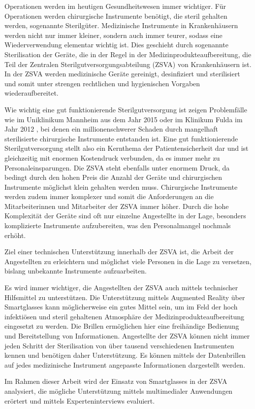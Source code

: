 
Operationen werden im heutigen Gesundheitswesen immer wichtiger. Für Operationen werden chirurgische Instrumente benötigt, die steril gehalten werden, sogenannte Sterilgüter.
Medizinische Instrumente in Krankenhäusern werden nicht nur immer kleiner, sondern auch immer teurer, sodass eine Wiederverwendung elementar wichtig ist. Dies geschieht durch sogenannte Sterilisation der Geräte, die in der Regel in der Medizinprodukteaufbereitung, die Teil der Zentralen Sterilgutversorgungsabteilung (ZSVA) von Krankenhäusern ist. In der ZSVA werden medizinische Geräte gereinigt, desinfiziert und sterilisiert und somit unter strengen rechtlichen und hygienischen Vorgaben wiederaufbereitet. 

Wie wichtig eine gut funktionierende Sterilgutversorgung ist zeigen Problemfälle wie im Uniklinikum Mannheim \cite{Brandt2015} aus dem Jahr 2015 oder im Klinikum Fulda im Jahr 2012 \cite{HygieneFuldar2012}, bei denen ein millionenschwerer Schaden durch mangelhaft sterilisierte chirurgische Instrumente entstanden ist. Eine gut funktionierende Sterilgutversorgung stellt also ein Kernthema der Patientensicherheit dar und ist gleichzeitig mit enormen Kostendruck verbunden, da es immer mehr zu Personaleinsparungen. Die ZSVA steht ebenfalls unter enormem Druck, da bedingt durch den hohen Preis die Anzahl der Geräte und chirurgischen Instrumente möglichst klein gehalten werden muss. Chirurgische Instrumente werden zudem immer komplexer und somit die Anforderungen an die Mitarbeiterinnen und Mitarbeiter der ZSVA immer höher. Durch die hohe Komplexität der Geräte sind oft nur einzelne Angestellte in der Lage, besonders komplizierte Instrumente aufzubereiten, was den Personalmangel nochmals erhöht.

Ziel einer technischen Unterstützung innerhalb der ZSVA ist, die Arbeit der Angestellten zu erleichtern und möglichst viele Personen in die Lage zu versetzen, bislang unbekannte Instrumente aufzuarbeiten.

Es wird immer wichtiger, die Angestellten der ZSVA auch mittels technischer Hilfsmittel zu unterstützen. Die Unterstützung mittels Augmented Reality über Smartglasses kann möglicherweise ein gutes Mittel sein, um im Feld der hoch infektiösen und steril gehaltenen Atmosphäre der Medizinprodukteaufbereitung eingesetzt zu werden. Die Brillen ermöglichen hier eine freihändige Bedienung und Bereitstellung von Informationen. Angestellte der ZSVA können nicht immer jeden Schritt der Sterilisation von über tausend verschiedenen Instrumenten kennen und benötigen daher Unterstützung. Es können mittels der Datenbrillen auf jedes medizinische Instrument angepasste Informationen dargestellt werden. 

Im Rahmen dieser Arbeit wird der Einsatz von Smartglasses in der ZSVA analysiert, die mögliche Unterstützung mittels multimedialer Anwendungen erörtert und mittels Experteninterviews evaluiert. 